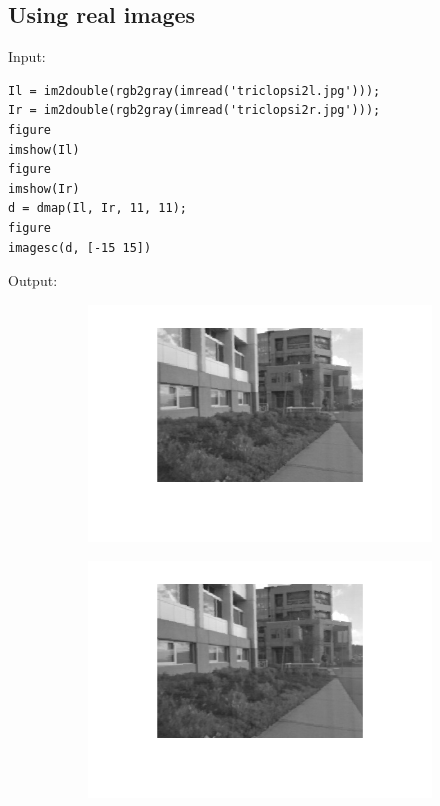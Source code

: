 \documentclass[12pt, a4paper]{article}
\begin{document}
\subsection{Using real images}
Input:
\begin{verbatim}
Il = im2double(rgb2gray(imread('triclopsi2l.jpg')));
Ir = im2double(rgb2gray(imread('triclopsi2r.jpg')));
figure
imshow(Il)
figure
imshow(Ir)
d = dmap(Il, Ir, 11, 11);
figure
imagesc(d, [-15 15])
\end{verbatim}
Output:
\begin{figure}[H]
    \centering %
    \begin{subfigure}[b]{0.45\textwidth}
        \includegraphics[width=\textwidth]{fig20.png}
    \end{subfigure}
    \begin{subfigure}[b]{0.45\textwidth}
        \includegraphics[width=\textwidth]{fig21.png}
    \end{subfigure}
\end{figure}
\end{document}
